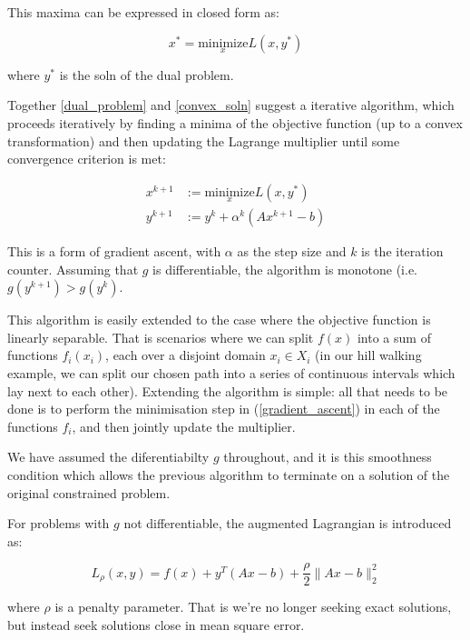 \documentclass[titlepage]{article}
\begin{document}
This maxima can be expressed in closed form as:

\begin{equation}
x^* = \underset{x}{\text{minimize}} L\left(x, y^*\right) 
\label{convex_soln}
\end{equation}

where \(y^*\) is the soln of the dual problem. 

Together \ref{dual_problem} and \ref{convex_soln} suggest a iterative algorithm, which proceeds iteratively by finding a minima of the objective function (up to a convex transformation) and then updating the Lagrange multiplier until some convergence criterion is met: 

\begin{align}
x^{k+1} &:= \underset{x}{\text{minimize}} L\left(x, y^*\right)  \\
y^{k+1} &:= y^{k} + \alpha^k \left(Ax^{k+1} - b\right)
\label{gradient_ascent}
\end{align}

This is a form of gradient ascent, with \( \alpha \) as the step size and \(k\) is the iteration counter. Assuming that \(g\) is differentiable, the algorithm is monotone (i.e. \( g\left(y^{k+1}\right) > g\left(y^{k}\right)\).

This algorithm is easily extended to the case where the objective function is linearly separable. That is scenarios where we can split \(f\left(x\right)\) into a sum of functions \(f_i\left(x_i\right)\), each over a disjoint domain \(x_i \in X_i\) (in our hill walking example, we can split our chosen path into a series of continuous intervals which lay next to each other). Extending the algorithm is simple: all that needs to be done is to perform the minimisation step in (\ref{gradient_ascent}) in each of the functions \(f_i\), and then jointly update the multiplier.

We have assumed the diferentiabilty \(g\) throughout, and it is this smoothness condition which allows the previous algorithm to terminate on a solution of the original constrained problem.

For problems with \(g\) not differentiable, the augmented Lagrangian is introduced as:

\begin{equation}
L_\rho\left(x,y\right) = f\left( x \right) + y^T\left(Ax-b\right) + \frac{\rho}{2}\|Ax-b\|_2^2
\end{equation}

where \(\rho\) is a penalty parameter. That is we're no longer seeking exact solutions, but instead seek solutions close in mean square error. 
\end{document}

